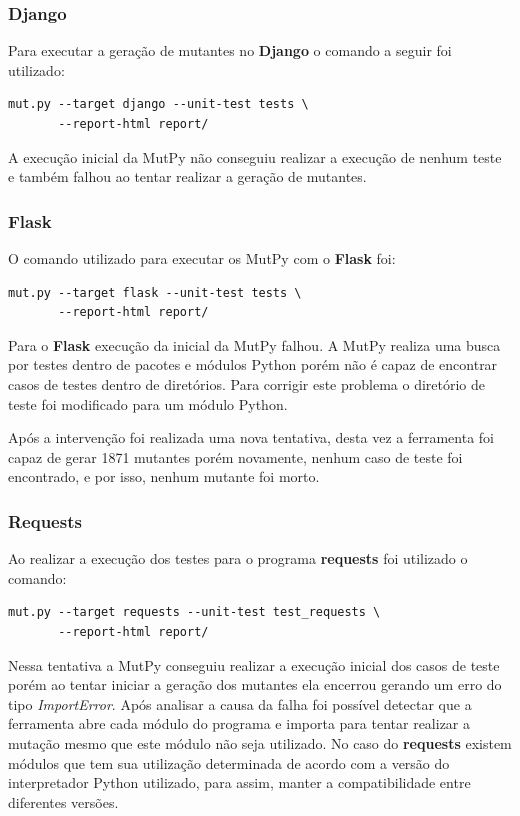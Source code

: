 \documentclass[12pt]{article}
\begin{document}
\subsubsection{Django}

Para executar a geração de mutantes no \textbf{Django} o comando
a seguir foi utilizado:

\begin{verbatim}
mut.py --target django --unit-test tests \
       --report-html report/
\end{verbatim}

A execução inicial da MutPy não conseguiu realizar a execução de
nenhum teste e também falhou ao tentar realizar a geração de
mutantes.

\subsubsection{Flask}

O comando utilizado para executar os MutPy com o \textbf{Flask} foi:

\begin{verbatim}
mut.py --target flask --unit-test tests \
       --report-html report/
\end{verbatim}

Para o \textbf{Flask} execução da inicial da MutPy falhou. 
A MutPy realiza uma busca por testes
dentro de pacotes e módulos Python porém não é capaz de encontrar
casos de testes dentro de diretórios. Para corrigir este problema 
o diretório de teste foi modificado para um módulo Python.

Após a intervenção foi realizada uma nova tentativa, desta vez a
ferramenta foi capaz de gerar 1871 mutantes porém novamente, nenhum 
caso de  teste foi encontrado, e por isso, nenhum mutante foi morto.

\subsubsection{Requests}

Ao realizar a execução dos testes para o programa \textbf{requests} foi
utilizado o comando:

\begin{verbatim}
mut.py --target requests --unit-test test_requests \
       --report-html report/
\end{verbatim}

Nessa tentativa a MutPy conseguiu realizar a execução inicial dos casos 
de teste porém ao tentar iniciar a geração dos mutantes ela encerrou gerando 
um erro do tipo \textit{ImportError}. 
Após analisar a causa da falha foi possível
detectar que a ferramenta abre cada módulo do programa e importa
para tentar realizar a mutação mesmo que este módulo não seja utilizado.
No caso do \textbf{requests} existem módulos que tem sua utilização
determinada de acordo com a versão do interpretador Python utilizado, para 
assim, manter a compatibilidade entre diferentes versões.
\end{document}
